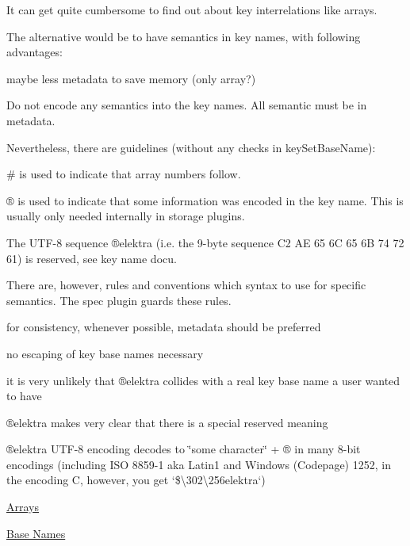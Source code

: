 It can get quite cumbersome to find out about key interrelations like arrays.

The alternative would be to have semantics in key names, with following advantages\+:


\begin{DoxyItemize}
\item maybe less metadata to save memory (only array?)
\end{DoxyItemize}

Do not encode any semantics into the key names. All semantic must be in metadata.

Nevertheless, there are guidelines (without any checks in {\ttfamily key\+Set\+Base\+Name})\+:


\begin{DoxyItemize}
\item {\ttfamily \#} is used to indicate that array numbers follow.
\item {\ttfamily ®} is used to indicate that some information was encoded in the key name. This is usually only needed internally in storage plugins.
\item The U\+T\+F-\/8 sequence {\ttfamily ®elektra} (i.\+e. the 9-\/byte sequence {\ttfamily C2 AE 65 6C 65 6B 74 72 61}) is reserved, see key name docu.
\end{DoxyItemize}

There are, however, rules and conventions which syntax to use for specific semantics. The {\ttfamily spec} plugin guards these rules.


\begin{DoxyItemize}
\item for consistency, whenever possible, metadata should be preferred
\item no escaping of key base names necessary
\item it is very unlikely that {\ttfamily ®elektra} collides with a real key base name a user wanted to have
\item {\ttfamily ®elektra} makes very clear that there is a special reserved meaning
\item {\ttfamily ®elektra} U\+T\+F-\/8 encoding decodes to \char`\"{}some character\char`\"{} + ® in many 8-\/bit encodings (including I\+SO 8859-\/1 aka Latin1 and Windows (Codepage) 1252, in the encoding {\ttfamily C}, however, you get `\textquotesingle{}\textquotesingle{}\$\textquotesingle{}\textbackslash{}302\textbackslash{}256\textquotesingle{}\textquotesingle{}elektra\textquotesingle{}`)
\end{DoxyItemize}


\begin{DoxyItemize}
\item \hyperlink{doc_decisions_array_md}{Arrays}
\item \hyperlink{doc_decisions_base_name_md}{Base Names}
\end{DoxyItemize}